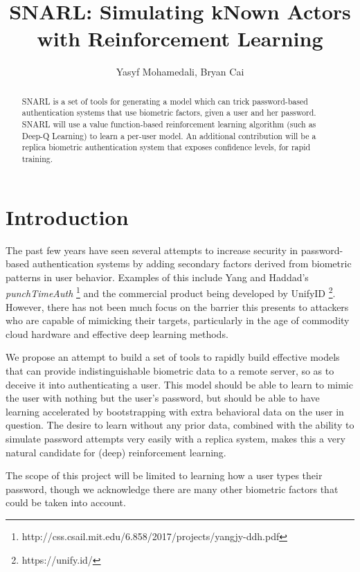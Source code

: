 \documentclass[preprint,12pt]{elsarticle}
\begin{document}
\begin{frontmatter}
\title{SNARL: Simulating kNown Actors with Reinforcement Learning}

\author{Yasyf Mohamedali, Bryan Cai}

\address{6.858 Project Proposal}

\begin{abstract}
  SNARL is a set of tools for generating a model which can trick password-based authentication systems that use biometric factors, given a user and her password. SNARL will use a value function-based reinforcement learning algorithm (such as Deep-Q Learning) to learn a per-user model. An additional contribution will be a replica biometric authentication system that exposes confidence levels, for rapid training.
\end{abstract}
\end{frontmatter}

\section{Introduction}

The past few years have seen several attempts to increase security in password-based authentication systems by adding secondary factors derived from biometric patterns in user behavior. Examples of this include Yang and Haddad's \textit{punchTimeAuth} \footnote{http://css.csail.mit.edu/6.858/2017/projects/yangjy-ddh.pdf} and the commercial product being developed by UnifyID \footnote{https://unify.id/}. However, there has not been much focus on the barrier this presents to attackers who are capable of mimicking their targets, particularly in the age of commodity cloud hardware and effective deep learning methods.

We propose an attempt to build a set of tools to rapidly build effective models that can provide indistinguishable biometric data to a remote server, so as to deceive it into authenticating a user. This model should be able to learn to mimic the user with nothing but the user's password, but should be able to have learning accelerated by bootstrapping with extra behavioral data on the user in question. The desire to learn without any prior data, combined with the ability to simulate password attempts very easily with a replica system, makes this a very natural candidate for (deep) reinforcement learning.

The scope of this project will be limited to learning how a user types their password, though we acknowledge there are many other biometric factors that could be taken into account.
\end{document}
